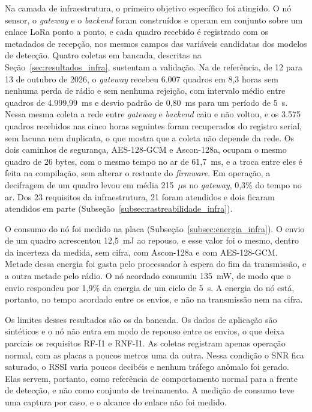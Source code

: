 Na camada de infraestrutura, o primeiro objetivo específico foi atingido. O nó sensor, o \textit{gateway} e o \textit{backend} foram construídos e operam em conjunto sobre um enlace LoRa ponto a ponto, e cada quadro recebido é registrado com os metadados de recepção, nos mesmos campos das variáveis candidatas dos modelos de detecção. Quatro coletas em bancada, descritas na Seção~\ref{sec:resultados_infra}, sustentam a validação. Na de referência, de 12 para 13 de outubro de 2026, o \textit{gateway} recebeu 6.007 quadros em 8,3 horas sem nenhuma perda de rádio e sem nenhuma rejeição, com intervalo médio entre quadros de 4.999,99~ms e desvio padrão de 0,80~ms para um período de 5~s. Nessa mesma coleta a rede entre \textit{gateway} e \textit{backend} caiu e não voltou, e os 3.575 quadros recebidos nas cinco horas seguintes foram recuperados do registro serial, sem lacuna nem duplicata, o que mostra que a coleta não depende da rede. Os dois caminhos de segurança, AES-128-GCM e Ascon-128a, ocupam o mesmo quadro de 26 bytes, com o mesmo tempo no ar de 61,7~ms, e a troca entre eles é feita na compilação, sem alterar o restante do \textit{firmware}. Em operação, a decifragem de um quadro levou em média 215~$\mu$s no \textit{gateway}, 0,3\% do tempo no ar. Dos 23 requisitos da infraestrutura, 21 foram atendidos e dois ficaram atendidos em parte (Subseção~\ref{subsec:rastreabilidade_infra}).

O consumo do nó foi medido na placa (Subseção~\ref{subsec:energia_infra}). O envio de um quadro acrescentou 12,5~mJ ao repouso, e esse valor foi o mesmo, dentro da incerteza da medida, sem cifra, com Ascon-128a e com AES-128-GCM. Metade dessa energia foi gasta pelo processador à espera do fim da transmissão, e a outra metade pelo rádio. O nó acordado consumiu 135~mW, de modo que o envio respondeu por 1,9\% da energia de um ciclo de 5~s. A energia do nó está, portanto, no tempo acordado entre os envios, e não na transmissão nem na cifra.

Os limites desses resultados são os da bancada. Os dados de aplicação são sintéticos e o nó não entra em modo de repouso entre os envios, o que deixa parciais os requisitos RF-I1 e RNF-I1. As coletas registram apenas operação normal, com as placas a poucos metros uma da outra. Nessa condição o SNR fica saturado, o RSSI varia poucos decibéis e nenhum tráfego anômalo foi gerado. Elas servem, portanto, como referência de comportamento normal para a frente de detecção, e não como conjunto de treinamento. A medição de consumo teve uma captura por caso, e o alcance do enlace não foi medido.
